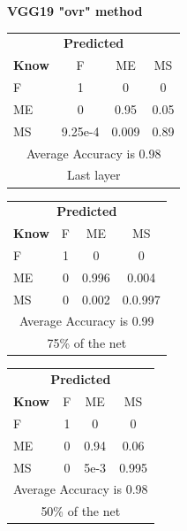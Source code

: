 \documentclass[12pt]{article} %
\begin{document}
\begin{center}
\textbf{ VGG19  "ovr" method}
\end{center}
\begin{minipage}{0.5\textwidth}
\begin{center}
\begin{tabular}{l|c|c|c|}
 \multicolumn{4}{c}{ \textbf{ Predicted}}\\
 \textbf{Know}&F&ME&MS\\ \hline\hline
F   &1&0&0\\
ME &0&0.95&0.05\\
MS &9.25e-4&0.009&0.89\\
\multicolumn{4}{c}{Average Accuracy is 0.98}\\
\multicolumn{4}{c}{Last layer}\\
\end{tabular}
\end{center}
\end{minipage}
\begin{minipage}{0.5\textwidth}
\begin{center}
\begin{tabular}{l|c|c|c|}
 \multicolumn{4}{c}{ \textbf{ Predicted}}\\
 \textbf{Know}&F&ME&MS\\ \hline\hline
F   &1&0&0\\
ME &0&0.996&0.004\\
MS &0&0.002&0.0.997\\
\multicolumn{4}{c}{Average Accuracy is 0.99}\\
\multicolumn{4}{c}{75\%  of the net}\\
\end{tabular}
\end{center}
\end{minipage}
\begin{minipage}{0.5\textwidth}
\begin{center}
\begin{tabular}{l|c|c|c|}
 \multicolumn{4}{c}{ \textbf{ Predicted}}\\
 \textbf{Know}&F&ME&MS\\ \hline\hline
F   &1&0&0\\
ME &0&0.94&0.06\\
MS &0&5e-3&0.995\\
\multicolumn{4}{c}{Average Accuracy is 0.98}\\
\multicolumn{4}{c}{50\%  of the net}\\
\end{tabular}
\end{center}
\end{minipage}
\end{document}
